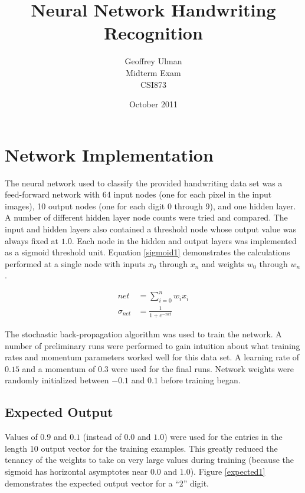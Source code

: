 \documentclass{article}
\begin{document}
\title{Neural Network Handwriting Recognition}
\author{Geoffrey Ulman\\
        Midterm Exam\\
        CSI873}
\date{October 2011}
\maketitle

\tableofcontents

\section{Network Implementation}\label{Network Parameters}

The neural network used to classify the provided handwriting data set was a feed-forward network with 64 input nodes (one for each pixel in the input images), 10 output nodes (one for each digit 0 through 9), and one hidden layer. A number of different hidden layer node counts were tried and compared. The input and hidden layers also contained a threshold node whose output value was always fixed at \(1.0\). Each node in the hidden and output layers was implemented as a sigmoid threshold unit. Equation \ref{sigmoid1} demonstrates the calculations performed at a single node with inputs \(x_{0}\) through \(x_{n}\) and weights \(w_{0}\) through \(w_{n}\).

\begin{equation}\label{sigmoid1}
\begin{split}
net &= \sum\limits_{i=0}^n w_{i}x_{i}\\
\sigma_{net} &= \frac{1}{1+e^{-net}}
\end{split}
\end{equation}

The stochastic back-propagation algorithm was used to train the network. A number of preliminary runs were performed to gain intuition about what training rates and momentum parameters worked well for this data set. A learning rate of \(0.15\) and a momentum of \(0.3\) were used for the final runs. Network weights were randomly initialized between \(-0.1\) and \(0.1\) before training began.

\subsection{Expected Output}\label{expectedout}

Values of \(0.9\) and \(0.1\) (instead of \(0.0\) and \(1.0\)) were used for the entries in the length 10 output vector for the training examples. This greatly reduced the tenancy of the weights to take on very large values during training (because the sigmoid has horizontal asymptotes near \(0.0\) and \(1.0\)). Figure \ref{expected1} demonstrates the expected output vector for a ``2'' digit.
\end{document}
